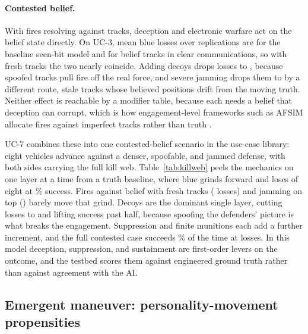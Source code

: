 \documentclass[11pt]{article}
\begin{document}
\paragraph{Contested belief.} With fires resolving against tracks, deception and electronic warfare
act on the belief state directly. On UC-3, mean blue losses over \beliefNRep{} replications are \beliefBaseLoss{} for the baseline seen-bit model and \beliefCleanLoss{} for belief tracks in clear communications, so with fresh tracks the two nearly coincide. Adding decoys drops losses to \beliefDecoyLoss{}, because spoofed tracks pull fire off the real force, and severe jamming drops them to \beliefJamLoss{} by a different route, stale tracks whose believed positions drift from the moving truth. Neither effect is reachable by a modifier table, because each needs a belief that deception can corrupt, which is how engagement-level frameworks such as AFSIM allocate fires against imperfect tracks rather than truth \citep{tryhorn2021afsim}.

UC-7 combines these into one contested-belief scenario in the use-case library: eight vehicles advance against a denser, spoofable, and jammed defense, with both sides carrying the full kill web. Table~\ref{tab:killweb} peels the mechanics on one layer at a time from a truth baseline, where blue grinds forward and loses \ucSevenTruthLoss{} of eight at \ucSevenTruthSucc\% success. Fires against belief with fresh tracks (\ucSevenBeliefLoss{} losses) and jamming on top (\ucSevenJamLoss{}) barely move that grind. Decoys are the dominant single layer, cutting losses to \ucSevenDecoyLoss{} and lifting success past half, because spoofing the defenders' picture is what breaks the engagement. Suppression and finite munitions each add a further increment, and the full contested case succeeds \ucSevenFullSucc\% of the time at \ucSevenFullLoss{} losses. In this model deception, suppression, and sustainment are first-order levers on the outcome, and the testbed scores them against engineered ground truth rather than against agreement with the AI.

\begin{table}[H]
\centering
\caption{UC-7 contested-belief scenario: kill-web mechanics peeled on one layer at a time from a truth baseline (fires against truth, no suppression, unlimited munitions) up to the full contested case. Means over \ucSevenNRep{} replications.}
\label{tab:killweb}

\end{table}

\subsection{Emergent maneuver: personality-movement propensities}
\label{subsec:personality}
\end{document}

